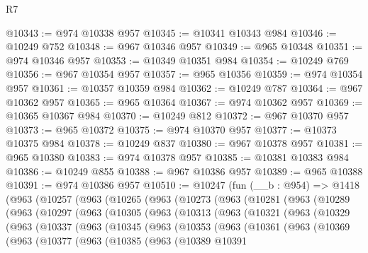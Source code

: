 \begin{lexlean}{R7}
\begin{coremodule}
@10343 := @974 @10338 @957
@10345 := @10341 @10343 @984
@10346 := @10249 @752
@10348 := @967 @10346 @957
@10349 := @965 @10348
@10351 := @974 @10346 @957
@10353 := @10349 @10351 @984
@10354 := @10249 @769
@10356 := @967 @10354 @957
@10357 := @965 @10356
@10359 := @974 @10354 @957
@10361 := @10357 @10359 @984
@10362 := @10249 @787
@10364 := @967 @10362 @957
@10365 := @965 @10364
@10367 := @974 @10362 @957
@10369 := @10365 @10367 @984
@10370 := @10249 @812
@10372 := @967 @10370 @957
@10373 := @965 @10372
@10375 := @974 @10370 @957
@10377 := @10373 @10375 @984
@10378 := @10249 @837
@10380 := @967 @10378 @957
@10381 := @965 @10380
@10383 := @974 @10378 @957
@10385 := @10381 @10383 @984
@10386 := @10249 @855
@10388 := @967 @10386 @957
@10389 := @965 @10388
@10391 := @974 @10386 @957
@10510 := @10247
    (fun (__b : @954) =>
    @1418
      (@963
        (@10257
          (@963
            (@10265
              (@963
                (@10273
                  (@963
                    (@10281
                      (@963
                        (@10289
                          (@963
                            (@10297
                              (@963
                                (@10305
                                  (@963
                                    (@10313
                                      (@963
                                        (@10321
                                          (@963
                                            (@10329
                                              (@963
                                                (@10337
                                                  (@963
                                                    (@10345
                                                      (@963
                                                        (@10353
                                                          (@963
                                                            (@10361
                                                              (@963
                                                                (@10369
                                                                  (@963
                                                                    (@10377
                                                                      (@963
                                                                        (@10385
                                                                          (@963
                                                                            (@10389
                                                                              @10391

\end{coremodule}
\end{lexlean}
